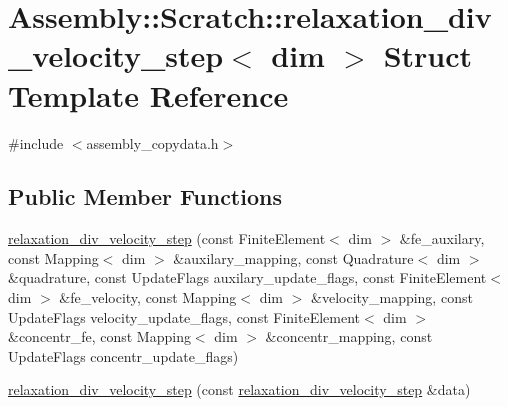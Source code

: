 \hypertarget{struct_assembly_1_1_scratch_1_1relaxation__div__velocity__step}{}\section{Assembly\+:\+:Scratch\+:\+:relaxation\+\_\+div\+\_\+velocity\+\_\+step$<$ dim $>$ Struct Template Reference}
\label{struct_assembly_1_1_scratch_1_1relaxation__div__velocity__step}


{\ttfamily \#include $<$assembly\+\_\+copydata.\+h$>$}

\subsection*{Public Member Functions}
\begin{DoxyCompactItemize}
\item 
\hyperlink{struct_assembly_1_1_scratch_1_1relaxation__div__velocity__step_ac3a5853ca83d9a9c1b5f9a14792369eb}{relaxation\+\_\+div\+\_\+velocity\+\_\+step} (const Finite\+Element$<$ dim $>$ \&fe\+\_\+auxilary, const Mapping$<$ dim $>$ \&auxilary\+\_\+mapping, const Quadrature$<$ dim $>$ \&quadrature, const Update\+Flags auxilary\+\_\+update\+\_\+flags, const Finite\+Element$<$ dim $>$ \&fe\+\_\+velocity, const Mapping$<$ dim $>$ \&velocity\+\_\+mapping, const Update\+Flags velocity\+\_\+update\+\_\+flags, const Finite\+Element$<$ dim $>$ \&concentr\+\_\+fe, const Mapping$<$ dim $>$ \&concentr\+\_\+mapping, const Update\+Flags concentr\+\_\+update\+\_\+flags)
\item 
\hyperlink{struct_assembly_1_1_scratch_1_1relaxation__div__velocity__step_a5386826f18101deb13e7651062637a85}{relaxation\+\_\+div\+\_\+velocity\+\_\+step} (const \hyperlink{struct_assembly_1_1_scratch_1_1relaxation__div__velocity__step}{relaxation\+\_\+div\+\_\+velocity\+\_\+step} \&data)
\end{DoxyCompactItemize}
